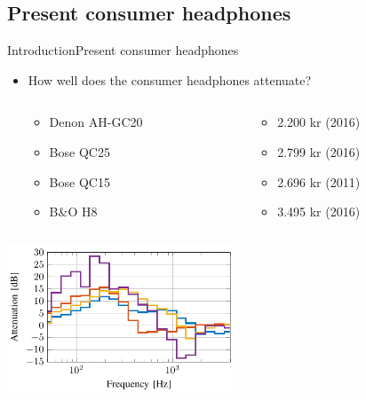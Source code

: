 \subsection{Present consumer headphones}
\begin{frame}{Introduction}{Present consumer headphones}
	\begin{itemize}	
	\item How well does the consumer headphones attenuate?
	\begin{columns}
		\begin{column}{0.27\textwidth}
		\begin{itemize}
			\item Denon AH-GC20
			\item Bose QC25 
			\item Bose QC15 	
			\item B\&O H8 	
		\end{itemize}
		\end{column}
		\begin{column}{0.6\textwidth} 
		\begin{itemize}
			\item[] 2.200 kr (2016)
			\item[] 2.799 kr (2016)
			\item[] 2.696 kr (2011)
			\item[] 3.495 kr (2016)
		\end{itemize}
		\end{column}
	\end{columns}
	\end{itemize}			
	\begin{center}
		\includegraphics[width=0.5\textwidth]{figures/ComparedConusmerHP}
	\end{center}	
\end{frame}





